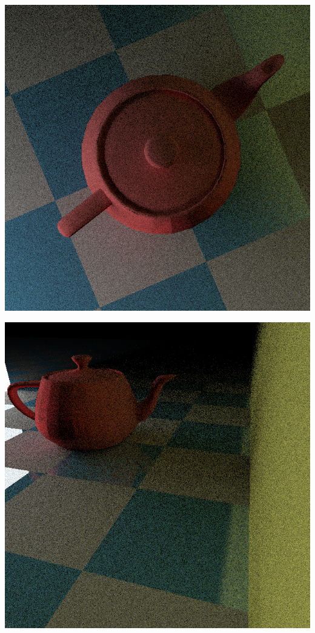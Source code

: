\begin{center}
\begin{minipage}{0.48\linewidth}
\includegraphics[width=\linewidth]{img/teapot-top.png}
\end{minipage}
\begin{minipage}{0.48\linewidth}
\includegraphics[width=\linewidth]{img/wall.png}
\end{minipage}
\end{center}

